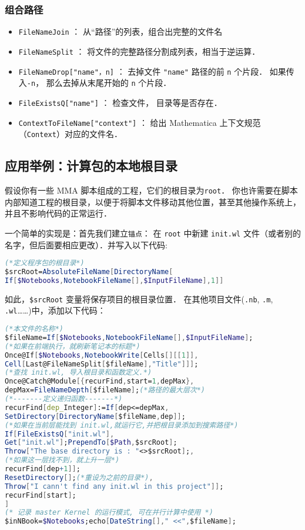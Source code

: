 \subsubsection{组合路径}

\begin{itemize}
\item \verb`FileNameJoin` ： 从“路径”的列表，组合出完整的文件名
\item \verb`FileNameSplit` ： 将文件的完整路径分割成列表，相当于逆运算．
\item \verb`FileNameDrop["name"，n]` ： 去掉文件 \verb`"name"` 路径的前 \verb`n` 个片段． 
如果传入\verb`-n`， 那么去掉从末尾开始的 \verb`n` 个片段．
\item \verb`FileExistsQ["name"]`  ： 检查文件， 目录等是否存在．
\item \verb`ContextToFileName["context"]`  ： 给出 Mathematica 上下文规范（\verb`Context`）对应的文件名．
\end{itemize}

\subsection{应用举例：计算包的本地根目录}

假设你有一些 MMA 脚本组成的工程，它们的根目录为\verb`root`．
你也许需要在脚本内部知道工程的根目录，以便于将脚本文件移动其他位置，甚至其他操作系统上，并且不影响代码的正常运行．

一个简单的实现是：首先我们建立\verb`锚点`：
在 \verb`root` 中新建 \verb`init.wl` 文件（或者别的名字，但后面要相应更改）．并写入以下代码:
\begin{lstlisting}[language=mathematica]
(*定义程序包的根目录*)
$srcRoot=AbsoluteFileName[DirectoryName[
If[$Notebooks,NotebookFileName[],$InputFileName],1]]
\end{lstlisting}
如此，\verb`$srcRoot` 变量将保存项目的根目录位置．
在其他项目文件(\verb`.nb`, \verb`.m`, \verb`.wl`……)中，添加以下代码：
\begin{lstlisting}[language=mathematica]
(*本文件的名称*)
$fileName=If[$Notebooks,NotebookFileName[],$InputFileName];
(*如果在前端执行，就刷新笔记本的标题*)
Once@If[$Notebooks,NotebookWrite[Cells[][[1]],
Cell[Last@FileNameSplit[$fileName],"Title"]]];
(*查找 init.wl, 导入根目录和函数定义.*)
Once@Catch@Module[{recurFind,start=1,depMax},
depMax=FileNameDepth[$fileName];(*路径的最大层次*)
(*-------定义递归函数-------*)
recurFind[dep_Integer]:=If[dep<=depMax,
SetDirectory[DirectoryName[$fileName,dep]];
(*如果在当前层能找到 init.wl,就运行它,并把根目录添加到搜索路径*)
If[FileExistsQ["init.wl"],
Get["init.wl"];PrependTo[$Path,$srcRoot];
Throw["The base directory is : "<>$srcRoot];,
(*如果这一层找不到，就上升一层*)
recurFind[dep+1]];
ResetDirectory[];(*重设为之前的目录*),
Throw["I cann't find any init.wl in this project"]];
recurFind[start];
]
(* 记录 master Kernel 的运行模式, 可在并行计算中使用 *)
$inNBook=$Notebooks;echo[DateString[]," <<",$fileName];
\end{lstlisting}
